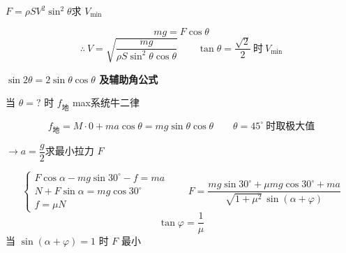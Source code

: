 \begin{problem}[3]

$F=\rho SV^2\sin^2\theta$\quad 求 $V_{\min}$
\begin{solution}
\[mg=F\cos\theta\]
\[\therefore\ V=\sqrt{\frac{mg}{\rho S\sin^2\theta\cos\theta}}\qquad \tan\theta=\frac{\sqrt{2}}{2}\ \text{时}\ V_{\min}\] %

\end{solution}
\end{problem}
\begin{problem}[4]
\textbf{$\sin2\theta=2\sin\theta\cos\theta$ 及辅助角公式}


当 $\theta=?$ 时 $f_{\text{地}}$ max\qquad 系统牛二律
\begin{solution}
\[f_{\text{地}}=M\cdot0+ma\cos\theta=mg\sin\theta\cos\theta\qquad \theta=45^\circ\ \text{时取极大值}\]
\end{solution}
\end{problem}
\begin{problem}[5]

$\to a=\dfrac{g}{2}$\quad 求最小拉力 $F$
\begin{solution}
\[\left\{\begin{array}{l}F\cos\alpha-mg\sin30^\circ-f=ma\\ N+F\sin\alpha=mg\cos30^\circ\\ f=\mu N\end{array}\right.\qquad F=\frac{mg\sin30^\circ+\mu mg\cos30^\circ+ma}{\sqrt{1+\mu^2}\,\sin(\alpha+\varphi)}\]
\[\tan\varphi=\frac{1}{\mu}\]
当 $\sin(\alpha+\varphi)=1$ 时 $F$ 最小
\end{solution}
\end{problem}
